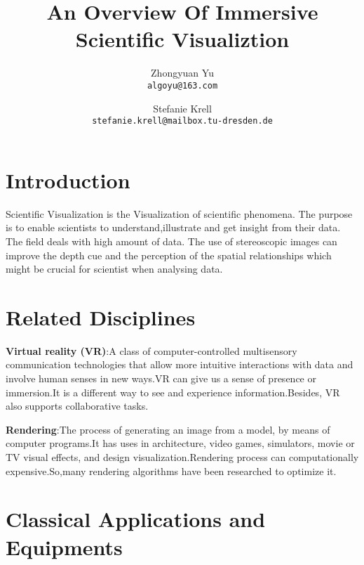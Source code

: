 \documentclass[10pt,twocolumn,letterpaper]{article}
\begin{document}
\title{An Overview Of Immersive Scientific Visualiztion}

\author{Zhongyuan Yu\\
{\tt\small algoyu@163.com}
\and
Stefanie Krell\\
{\tt\small stefanie.krell@mailbox.tu-dresden.de}
}

\maketitle


\section{Introduction}

Scientific Visualization is the Visualization of scientific phenomena. The purpose is to enable scientists to understand,illustrate and get insight from their data. The field deals with high amount of data. The use of stereoscopic images can improve the depth cue and the perception of the spatial relationships which might be crucial for scientist when analysing data.

\section{Related Disciplines}

\setlength{\parindent}{1pc}
\textbf{Virtual reality (VR)}:A class of computer-controlled multisensory communication technologies that allow more intuitive interactions with data and involve human senses in new ways.VR can give us a sense of presence or immersion.It is a different way to see and experience information.Besides, VR also supports collaborative tasks.

\setlength{\parindent}{1pc}
\textbf{Rendering}:The process of generating an image from a model, by means of computer programs.It has uses in architecture, video games, simulators, movie or TV visual effects, and design visualization.Rendering process can computationally expensive.So,many rendering algorithms have been researched to optimize it.


\section{Classical Applications and Equipments}
\end{document}
